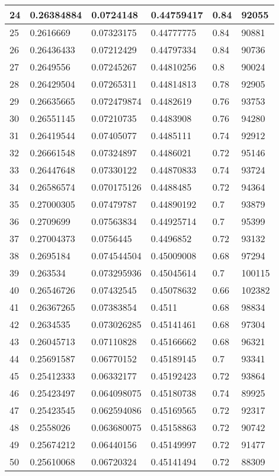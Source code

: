 \begin{longtable}{|l|l|l|l|l|l|}
24 & 0.26384884 & 0.0724148 & 0.44759417 & 0.84 & 92055 \\ \hline 
25 & 0.2616669 & 0.07323175 & 0.44777775 & 0.84 & 90881 \\ \hline 
26 & 0.26436433 & 0.07212429 & 0.44797334 & 0.84 & 90736 \\ \hline 
27 & 0.2649556 & 0.07245267 & 0.44810256 & 0.8 & 90024 \\ \hline 
28 & 0.26429504 & 0.07265311 & 0.44814813 & 0.78 & 92905 \\ \hline 
29 & 0.26635665 & 0.072479874 & 0.4482619 & 0.76 & 93753 \\ \hline 
30 & 0.26551145 & 0.07210735 & 0.4483908 & 0.76 & 94280 \\ \hline 
31 & 0.26419544 & 0.07405077 & 0.4485111 & 0.74 & 92912 \\ \hline 
32 & 0.26661548 & 0.07324897 & 0.4486021 & 0.72 & 95146 \\ \hline 
33 & 0.26447648 & 0.07330122 & 0.44870833 & 0.74 & 93724 \\ \hline 
34 & 0.26586574 & 0.070175126 & 0.4488485 & 0.72 & 94364 \\ \hline 
35 & 0.27000305 & 0.07479787 & 0.44890192 & 0.7 & 93879 \\ \hline 
36 & 0.2709699 & 0.07563834 & 0.44925714 & 0.7 & 95399 \\ \hline 
37 & 0.27004373 & 0.0756445 & 0.4496852 & 0.72 & 93132 \\ \hline 
38 & 0.2695184 & 0.074544504 & 0.45009008 & 0.68 & 97294 \\ \hline 
39 & 0.263534 & 0.073295936 & 0.45045614 & 0.7 & 100115 \\ \hline 
40 & 0.26546726 & 0.07432545 & 0.45078632 & 0.66 & 102382 \\ \hline 
41 & 0.26367265 & 0.07383854 & 0.4511 & 0.68 & 98834 \\ \hline 
42 & 0.2634535 & 0.073026285 & 0.45141461 & 0.68 & 97304 \\ \hline 
43 & 0.26045713 & 0.07110828 & 0.45166662 & 0.68 & 96321 \\ \hline 
44 & 0.25691587 & 0.06770152 & 0.45189145 & 0.7 & 93341 \\ \hline 
45 & 0.25412333 & 0.06332177 & 0.45192423 & 0.72 & 93864 \\ \hline 
46 & 0.25423497 & 0.064098075 & 0.45180738 & 0.74 & 89925 \\ \hline 
47 & 0.25423545 & 0.062594086 & 0.45169565 & 0.72 & 92317 \\ \hline 
48 & 0.2558026 & 0.063680075 & 0.45158863 & 0.72 & 90742 \\ \hline 
49 & 0.25674212 & 0.06440156 & 0.45149997 & 0.72 & 91477 \\ \hline 
50 & 0.25610068 & 0.06720324 & 0.45141494 & 0.72 & 88309 \\ \hline 
\end{longtable}